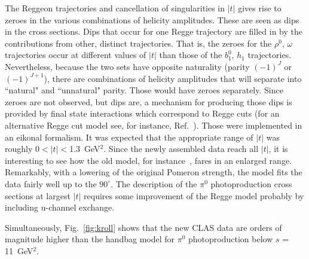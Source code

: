 \documentclass[aps,prc,twocolumn,floatfix,showpacs,preprintnumbers,amsmath,amssymb,superscriptaddress]{revtex4-1}
\begin{document}
The Reggeon trajectories and cancellation of singularities in $|t|$ 
gives rise to zeroes in the various combinations of helicity 
amplitudes. These are seen as dips in the cross sections. Dips that 
occur for one Regge trajectory are filled in by the contributions 
from other, distinct trajectories. That is, the zeroes for the 
$\rho^0, \, \omega$ trajectories occur at different values of $|t|$ 
than those of the $b_1^0, \, h_1$ trajectories. Nevertheless, 
because the two sets have opposite naturality (parity $(-1)^J$ or 
$(-1)^{J+1}$), there are combinations of helicity amplitudes that 
will separate into ``natural" and ``unnatural" parity.  Those would 
have zeroes separately. Since zeroes are not observed, but dips 
are, a mechanism for producing those dips is provided by final 
state interactions which correspond to Regge cuts (for an 
alternative Regge cut model see, for instance, Ref.~\cite{Laget}). 
Those were implemented in an eikonal formalism. It was expected 
that the appropriate range of $|t|$ was roughly $0 < |t| 
<$1.3~GeV$^2$. Since the newly assembled data reach all $|t|$, it 
is interesting to see how the old model, for instance~\cite{Goldstein}, 
fares in an enlarged range. Remarkably, with a lowering of the 
original Pomeron strength, %
the model fits the data 
fairly well up to the $90^\circ$.  The description of the $\pi^0$ 
photoproduction cross sections at largest $|t|$ requires some
improvement of the Regge model probably by including u-channel 
exchange.

Simultaneously, Fig.~\ref{fig:kroll} shows that the new CLAS data 
are orders of magnitude higher than 
the handbag model for $\pi^0$ photoproduction below 
$s$ = 11~GeV$^2$.
\end{document}
